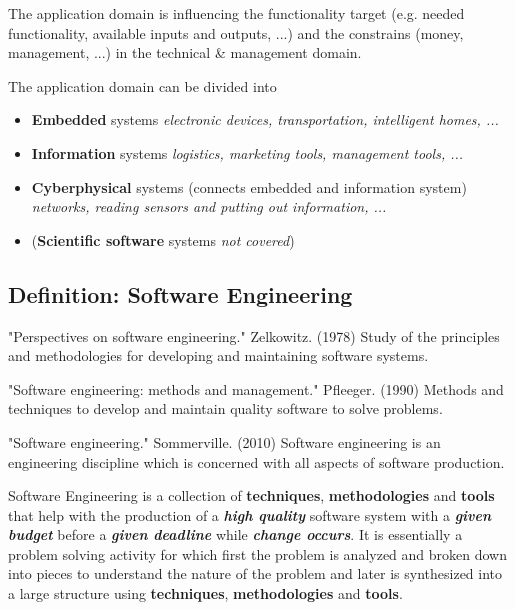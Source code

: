 The application domain is influencing the functionality target (e.g. needed functionality, available inputs and outputs, ...) and the constrains (money, management, ...) in the technical \& management domain.

The application domain can be divided into 
\begin{itemize}[topsep=5pt, itemsep=0pt]
    \item \textbf{Embedded} systems \textit{electronic devices, transportation, intelligent homes, ...}
    \item \textbf{Information} systems \textit{logistics, marketing tools, management tools, ...}
    \item \textbf{Cyberphysical} systems (connects embedded and information system) \textit{networks, reading sensors and putting out information, ...}
    \item (\textbf{Scientific software} systems \textit{not covered})
\end{itemize}



\subsection{Definition: Software Engineering}
\begin{chapquote}{"Perspectives on software engineering." Zelkowitz. (1978)}
    Study of the principles and methodologies for developing and maintaining software systems.
\end{chapquote}
\begin{chapquote}{"Software engineering: methods and management." Pfleeger. (1990)}
    Methods and techniques to develop and maintain quality software to solve
    problems.
\end{chapquote}
\begin{chapquote}{"Software engineering." Sommerville. (2010)}
    Software engineering is an engineering discipline which is concerned with all
    aspects of software production.
\end{chapquote}

Software Engineering is a collection of \textbf{techniques}, \textbf{methodologies} and \textbf{tools} that help with the production of a \textbf{\textit{high quality}} software system with a \textbf{\textit{given budget}} before a \textbf{\textit{given deadline}} while \textbf{\textit{change occurs}}.
It is essentially a problem solving activity for which first the problem is analyzed and broken down into pieces to understand the nature of the problem and later is synthesized into a large structure using \textbf{techniques}, \textbf{methodologies} and \textbf{tools}.

